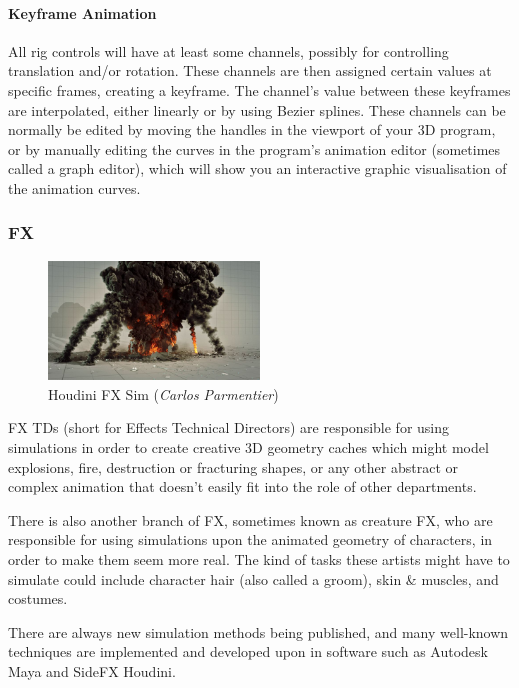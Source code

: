 \hypertarget{keyframe-animation}{%
\paragraph{Keyframe Animation}\label{keyframe-animation}}

All rig controls will have at least some channels, possibly for controlling translation and/or rotation. These channels are then assigned certain values at specific frames, creating a keyframe. The channel's value between these keyframes are interpolated, either linearly or by using Bezier splines. These channels can be normally be edited by moving the handles in the viewport of your 3D program, or by manually editing the curves in the program's animation editor (sometimes called a graph editor), which will show you an interactive graphic visualisation of the animation curves.

\hypertarget{fx}{%
\subsubsection{FX}\label{fx}}

\begin{figure}
\includegraphics[width=0.5\textwidth,height=\textheight]{./images/fx.png}
\caption{Houdini FX Sim (\emph{Carlos Parmentier})}
\end{figure}

FX TDs (short for Effects Technical Directors) are responsible for using simulations in order to create creative 3D geometry caches which might model explosions, fire, destruction or fracturing shapes, or any other abstract or complex animation that doesn't easily fit into the role of other departments.

There is also another branch of FX, sometimes known as creature FX, who are responsible for using simulations upon the animated geometry of characters, in order to make them seem more real. The kind of tasks these artists might have to simulate could include character hair (also called a groom), skin \& muscles, and costumes.

There are always new simulation methods being published, and many well-known techniques are implemented and developed upon in software such as Autodesk Maya and SideFX Houdini.

